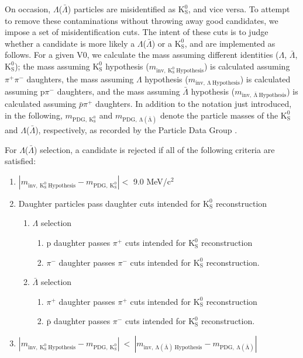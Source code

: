 \documentclass[ALICE,manyauthors]{cernphprep}
\newcommand{\Lam}{$\Lambda$\xspace}
\newcommand{\ALam}{$\bar{\Lambda}$\xspace}
\newcommand{\LamALam}{$\Lambda$($\bar{\Lambda}$)\xspace}
\newcommand{\Ks}{$\mathrm{K^{0}_{S}}$\xspace}
\begin{document}
On occasion, \LamALam particles are misidentified as \Ks, and vice versa.  
To attempt to remove these contaminations without throwing away good candidates, we impose a set of misidentification cuts.  
The intent of these cuts is to judge whether a candidate is more likely a \LamALam or a \Ks, and are implemented as follows.  
For a given V0, we calculate the mass assuming different identities (\Lam, \ALam, \Ks); the mass assuming \Ks hypothesis ($m_{\mathrm{inv,~ K^{0}_{S}~ Hypothesis}}$) is calculated assuming $\pi^{+}\pi^{-}$ daughters, the mass assuming \Lam hypothesis ($m_{\mathrm{inv,~ \Lambda~ Hypothesis}}$) is calculated assuming p$\pi^{-}$ daughters, and the mass assuming \ALam hypothesis ($m_{\mathrm{inv,~ \bar{\Lambda}~ Hypothesis}}$) is calculated assuming $\bar{p}\pi^{+}$ daughters.  
In addition to the notation just introduced, in the following, $m_{\mathrm{PDG,~ K^{0}_{S}}}$ and $m_{\mathrm{PDG,~ \Lambda(\bar{\Lambda})}}$ denote the particle masses of the \Ks and \LamALam, respectively, as recorded by the Particle Data Group \cite{Patrignani:2016xqp}.

For \LamALam selection, a candidate is rejected if all of the following criteria are satisfied:

\begin{enumerate}
 \item $\left|m_{\mathrm{inv,~ K^{0}_{S}~ Hypothesis}} - m_{\mathrm{PDG,~ K^{0}_{S}}}\right| < $ 9.0 MeV/c$^{2}$
 \item Daughter particles pass daughter cuts intended for \Ks reconstruction
 \begin{enumerate}
  \item \Lam selection
  \begin{enumerate}
   \item p daughter passes $\pi^{+}$ cuts intended for \Ks reconstruction
   \item $\pi^{-}$ daughter passes $\pi^{-}$ cuts intended for \Ks reconstruction.
  \end{enumerate}
  \item \ALam selection
  \begin{enumerate}
   \item $\pi^{+}$ daughter passes $\pi^{+}$ cuts intended for \Ks reconstruction
   \item $\bar{\mathrm{p}}$ daughter passes $\pi^{-}$ cuts intended for \Ks reconstruction.
  \end{enumerate}  
 \end{enumerate}
 \item $\left|m_{\mathrm{inv,~ K^{0}_{S}~ Hypothesis}} - m_{\mathrm{PDG,~ K^{0}_{S}}}\right|~ < ~\left|m_{\mathrm{inv,~ \Lambda(\bar{\Lambda})~ Hypothesis}} - m_{\mathrm{PDG,~ \Lambda(\bar{\Lambda})}}\right|$
\end{enumerate} 
\end{document}

